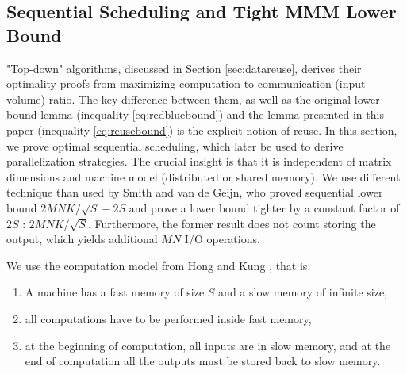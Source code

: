 \documentclass[sigplan,review,anonymous]{acmart}\settopmatter{printfolios=true,printccs=false,printacmref=false}
\newcommand\mac[1]{\textcolor{red}{[Mac: #1]}}
\begin{document}
%



\subsection{Sequential Scheduling and Tight MMM Lower Bound}
\label{sec:seqScheduling}

"Top-down" algorithms, discussed in Section \ref{sec:datareuse}, derives their 
optimality proofs from maximizing computation to communication (input volume) 
ratio.
The key difference between them, as well as the original lower bound lemma 
(inequality 
\ref{eq:redbluebound}) and the lemma presented in this paper (inequality 
\ref{eq:reusebound}) is the explicit notion of reuse. In this section, we prove 
optimal sequential scheduling, which later be used to derive parallelization 
strategies. The crucial insight is that it is independent of matrix dimensions 
and machine model (distributed or shared memory).
We use different technique than used by Smith and van de Geijn, who proved 
sequential lower bound $2MNK/\sqrt{S} - 2S$ and prove a lower bound tighter by 
a constant factor of $2S$ :  $2MNK/\sqrt{S}$. Furthermore, the former result 
does not count storing the output, which yields additional $MN$ I/O operations.

We use the computation model from Hong and Kung \cite{redblue}, that is:
\begin{enumerate}
	\item A machine has a fast memory of size $S$ and a slow memory of infinite 
	size,
	\item all computations have to be performed inside fast memory,
	\item at the beginning of computation, all inputs are in slow memory, and 
	at the end of computation all the outputs must be stored back to slow 
	memory. 
\end{enumerate}
\end{document}
